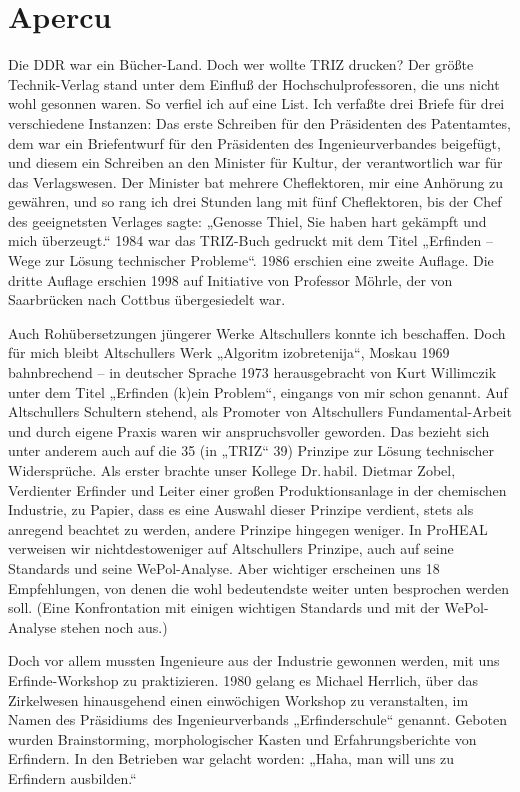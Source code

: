 \documentclass[12pt,a4paper]{article}
\begin{document}
\section*{Apercu}

\enlargethispage{-2em}
Die DDR war ein Bücher-Land. Doch wer wollte {TRIZ} drucken? Der größte
Technik-Verlag stand unter dem Einfluß der Hochschulprofessoren, die uns nicht
wohl gesonnen waren. So verfiel ich auf eine List. Ich verfaßte drei Briefe für
drei verschiedene Instanzen: Das erste Schreiben für den Präsidenten des
Patentamtes, dem war ein Briefentwurf für den Präsidenten des
Ingenieurverbandes beigefügt, und diesem ein Schreiben an den Minister für
Kultur, der verantwortlich war für das Verlagswesen. Der Minister bat mehrere
Cheflektoren, mir eine Anhörung zu gewähren, und so rang ich drei Stunden lang
mit fünf Cheflektoren, bis der Chef des geeignetsten Verlages sagte: „Genosse
Thiel, Sie haben hart gekämpft und mich überzeugt.“ 1984 war das {TRIZ}-Buch
gedruckt mit dem Titel „Erfinden – Wege zur Lösung technischer Probleme“. 1986
erschien eine zweite Auflage. Die dritte Auflage erschien 1998 auf Initiative
von Professor Möhrle, der von Saarbrücken nach Cottbus übergesiedelt war.

Auch Rohübersetzungen jüngerer Werke Altschullers konnte ich beschaffen. Doch
für mich bleibt Altschullers Werk „Algoritm izobretenija“, Moskau 1969
bahnbrechend – in deutscher Sprache 1973 herausgebracht von Kurt Willimczik
unter dem Titel „Erfinden (k)ein Problem“, eingangs von mir schon genannt. Auf
Altschullers Schultern stehend, als Promoter von Altschullers
Fundamental-Arbeit und durch eigene Praxis waren wir anspruchsvoller geworden.
Das bezieht sich unter anderem auch auf die 35 (in „TRIZ“ 39) Prinzipe zur
Lösung technischer Widersprüche. Als erster brachte unser Kollege Dr.\,habil.
Dietmar Zobel, Verdienter Erfinder und Leiter einer großen Produktionsanlage in
der chemischen Industrie, zu Papier, dass es eine Auswahl dieser Prinzipe
verdient, stets als anregend beachtet zu werden, andere Prinzipe hingegen
weniger. In ProHEAL verweisen wir nichtdestoweniger auf Altschullers Prinzipe,
auch auf seine Standards und seine WePol-Analyse. Aber wichtiger erscheinen uns
18 Empfehlungen, von denen die wohl bedeutendste weiter unten besprochen werden
soll.  (Eine Konfrontation mit einigen wichtigen Standards und mit der
WePol-Analyse stehen noch aus.)

Doch vor allem mussten Ingenieure aus der Industrie gewonnen werden, mit uns
Erfinde-Workshop zu praktizieren.  1980 gelang es Michael Herrlich, über das
Zirkelwesen hinausgehend einen einwöchigen Workshop zu veranstalten, im Namen
des Präsidiums des Ingenieurverbands „Erfinderschule“ genannt. Geboten wurden
Brainstorming, morphologischer Kasten und Erfahrungsberichte von Erfindern. In
den Betrieben war gelacht worden: „Haha, man will uns zu Erfindern ausbilden.“
\end{document}
